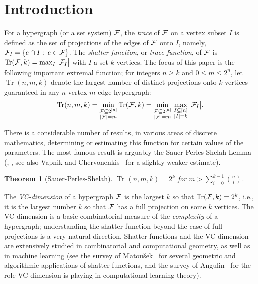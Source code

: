 \documentclass[11pt]{article}
\newtheorem{theo}{Theorem}[section]
\newtheorem{theo}{Theorem}[section]
\newcommand{\FF}{{\cal F}}
\newcommand{\sub}{\subseteq}
\DeclareMathOperator{\trace}{Tr}
\begin{document}
\section{Introduction}\label{se:intro}


For a hypergraph (or a set system) $\FF$, the \emph{trace} of $\FF$ on a vertex subset $I$ is defined as the set of projections of the edges of $\FF$ onto $I$, namely,
$\FF_I = \{e \cap I \,\colon\, e \in \FF \}$.
The \emph{shatter function}, or \emph{trace function}, of $\FF$ is 
$\trace(\FF,k) =\max_{I} \big|\FF_I\big|$ with $I$ a set $k$ vertices.
The focus of this paper is the following important extremal function; for integers $n \ge k$ and $0 \leq m \leq 2^n$, let $\trace(n,m,k)$ denote 
the largest number of distinct projections onto $k$ vertices guaranteed in any $n$-vertex $m$-edge hypergraph:
$$\trace(n,m,k) = \min_{\substack{\FF \sub 2^{[n]}\\|\FF|=m}} \trace(\FF,k) = \min_{\substack{\FF \sub 2^{[n]}\\|\FF|=m}} \, \max_{\substack{I \sub [n]\\|I|=k}} \big|\FF_I\big| .$$ 

There is a considerable number of results, in various areas of discrete mathematics, 
determining or estimating this function for certain values
of the parameters. The most famous result is arguably the Sauer-Perles-Shelah Lemma (\cite{Sa}, \cite{Sh}, see also
Vapnik and Chervonenkis~\cite{VC} for a slightly weaker estimate).
\begin {theo}[Sauer-Perles-Shelah]
\label{th:sps}
$\trace(n,m,k)=2^k$ for $m > \sum_{i=0}^{k-1} \binom{n}{i}$.
\end {theo}
The \emph{VC-dimension} of a hypergraph $\FF$ is the largest $k$ so that $\trace(\FF, k) = 2^k$, i.e., it is the largest number $k$ so that $\FF$ has a full projection on some $k$ vertices. The VC-dimension is a basic combinatorial measure of the \emph{complexity} of a hypergraph; understanding the shatter function beyond the case of full projections is a very natural direction. Shatter functions and the VC-dimension are extensively studied in combinatorial and computational geometry, as well as in machine learning (see the survey of Matou\v sek~\cite{Mat} for several geometric and algorithmic applications of shatter functions, and the survey of Angulin~\cite{An} for the role VC-dimension is playing in computational learning theory).
\end{document}
